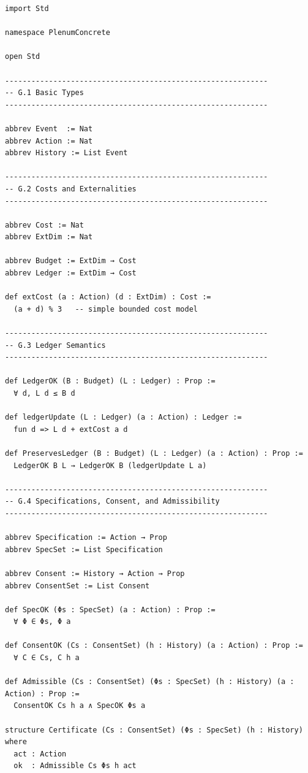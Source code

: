 \documentclass[11pt,oneside]{article}
\begin{document}
\begin{verbatim}
import Std

namespace PlenumConcrete

open Std

------------------------------------------------------------
-- G.1 Basic Types
------------------------------------------------------------

abbrev Event  := Nat
abbrev Action := Nat
abbrev History := List Event

------------------------------------------------------------
-- G.2 Costs and Externalities
------------------------------------------------------------

abbrev Cost := Nat
abbrev ExtDim := Nat

abbrev Budget := ExtDim → Cost
abbrev Ledger := ExtDim → Cost

def extCost (a : Action) (d : ExtDim) : Cost :=
  (a + d) % 3   -- simple bounded cost model

------------------------------------------------------------
-- G.3 Ledger Semantics
------------------------------------------------------------

def LedgerOK (B : Budget) (L : Ledger) : Prop :=
  ∀ d, L d ≤ B d

def ledgerUpdate (L : Ledger) (a : Action) : Ledger :=
  fun d => L d + extCost a d

def PreservesLedger (B : Budget) (L : Ledger) (a : Action) : Prop :=
  LedgerOK B L → LedgerOK B (ledgerUpdate L a)

------------------------------------------------------------
-- G.4 Specifications, Consent, and Admissibility
------------------------------------------------------------

abbrev Specification := Action → Prop
abbrev SpecSet := List Specification

abbrev Consent := History → Action → Prop
abbrev ConsentSet := List Consent

def SpecOK (Φs : SpecSet) (a : Action) : Prop :=
  ∀ Φ ∈ Φs, Φ a

def ConsentOK (Cs : ConsentSet) (h : History) (a : Action) : Prop :=
  ∀ C ∈ Cs, C h a

def Admissible (Cs : ConsentSet) (Φs : SpecSet) (h : History) (a : Action) : Prop :=
  ConsentOK Cs h a ∧ SpecOK Φs a

structure Certificate (Cs : ConsentSet) (Φs : SpecSet) (h : History) where
  act : Action
  ok  : Admissible Cs Φs h act


\end{verbatim}
\end{document}

